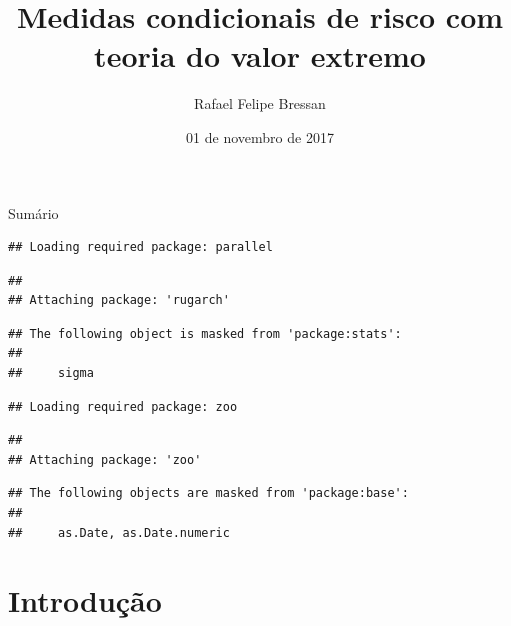 \documentclass[ignorenonframetext,]{beamer}
\title{Medidas condicionais de risco com teoria do valor extremo}
\author{Rafael Felipe Bressan}
\date{01 de novembro de 2017}
\begin{document}
\frame{\titlepage}

\section[]{}
\begin{frame}{Sumário}
  \tableofcontents
\end{frame}

\begin{frame}[fragile]

\begin{verbatim}
## Loading required package: parallel
\end{verbatim}

\begin{verbatim}
## 
## Attaching package: 'rugarch'
\end{verbatim}

\begin{verbatim}
## The following object is masked from 'package:stats':
## 
##     sigma
\end{verbatim}

\begin{verbatim}
## Loading required package: zoo
\end{verbatim}

\begin{verbatim}
## 
## Attaching package: 'zoo'
\end{verbatim}

\begin{verbatim}
## The following objects are masked from 'package:base':
## 
##     as.Date, as.Date.numeric
\end{verbatim}

\end{frame}

\section{Introdução}\label{introducao}
\end{document}
